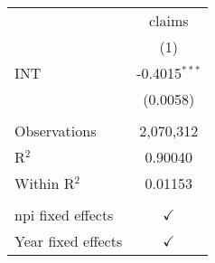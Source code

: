 
\begingroup
\centering
\begin{tabular}{lc}
   \toprule
                      & claims\\  
                      & (1)\\  
   \midrule 
   INT                & -0.4015$^{***}$\\   
                      & (0.0058)\\   
    \\
   Observations       & 2,070,312\\  
   R$^2$              & 0.90040\\  
   Within R$^2$       & 0.01153\\  
    \\
   npi fixed effects  & $\checkmark$\\   
   Year fixed effects & $\checkmark$\\   
   \bottomrule
\end{tabular}
\par\endgroup


